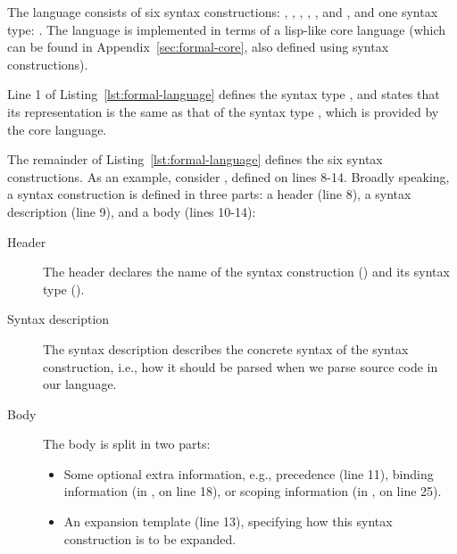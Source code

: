 \documentclass{kththesis}
\begin{document}

The language consists of six syntax constructions: , , , , , and , and one syntax type: . The language is implemented in terms of a lisp-like core language (which can be found in Appendix~\ref{sec:formal-core}, also defined using syntax constructions).

Line 1 of Listing~\ref{lst:formal-language} defines the syntax type , and states that its representation is the same as that of the syntax type , which is provided by the core language.

The remainder of Listing~\ref{lst:formal-language} defines the six syntax constructions. As an example, consider , defined on lines 8-14. Broadly speaking, a syntax construction is defined in three parts: a header (line 8), a syntax description (line 9), and a body (lines 10-14):

\begin{description}
  \item[Header] The header declares the name of the syntax construction () and its syntax type ().
  \item[Syntax description] The syntax description describes the concrete syntax of the syntax construction, i.e., how it should be parsed when we parse source code in our language.
  \item[Body] The body is split in two parts:
  \begin{itemize}
    \item Some optional extra information, e.g., precedence (line 11), binding information (in , on line 18), or scoping information (in , on line 25).
    \item An expansion template (line 13), specifying how this syntax construction is to be expanded.
  \end{itemize}
\end{description}
\end{document}
